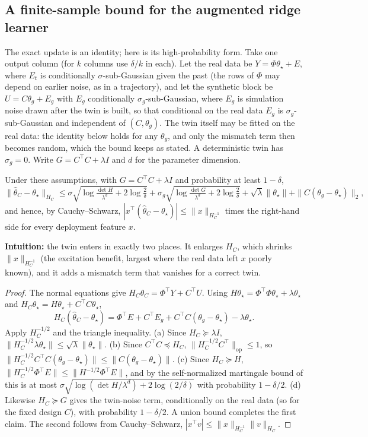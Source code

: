 \subsection{A finite-sample bound for the augmented ridge learner}\label{app:finite}
The exact update is an identity; here is its high-probability form. Take one output column (for $k$ columns use $\delta/k$ in each). Let the real data be $Y=\Phi\theta_\star+E$, where $E_t$ is conditionally $\sigma$-sub-Gaussian given the past (the rows of $\Phi$ may depend on earlier noise, as in a trajectory), and let the synthetic block be $U=C\theta_g+E_g$ with $E_g$ conditionally $\sigma_g$-sub-Gaussian, where $E_g$ is simulation noise drawn after the twin is built, so that conditional on the real data $E_g$ is $\sigma_g$-sub-Gaussian and independent of $(C,\theta_g)$. The twin itself may be fitted on the real data: the identity below holds for any $\theta_g$, and only the mismatch term then becomes random, which the bound keeps as stated. A deterministic twin has $\sigma_g=0$. Write $G=C^\top C+\lambda I$ and $d$ for the parameter dimension.

\begin{proposition}\label{prop:finite}
Under these assumptions, with $G=C^\top C+\lambda I$ and probability at least $1-\delta$,
\[
\|\widehat\theta_C-\theta_\star\|_{H_C}\le\sigma\sqrt{\log\tfrac{\det H}{\lambda^{d}}+2\log\tfrac2\delta}+\sigma_g\sqrt{\log\tfrac{\det G}{\lambda^{d}}+2\log\tfrac2\delta}+\sqrt\lambda\|\theta_\star\|+\|C(\theta_g-\theta_\star)\|_2,
\]
and hence, by Cauchy--Schwarz, $|x^\top(\widehat\theta_C-\theta_\star)|\le\|x\|_{H_C^{-1}}$ times the right-hand side for every deployment feature $x$.
\end{proposition}
\textbf{Intuition:} the twin enters in exactly two places. It enlarges $H_C$, which shrinks $\|x\|_{H_C^{-1}}$ (the excitation benefit, largest where the real data left $x$ poorly known), and it adds a mismatch term that vanishes for a correct twin.
\begin{proof}
The normal equations give $H_C\widehat\theta_C=\Phi^\top Y+C^\top U$. Using $H\theta_\star=\Phi^\top\Phi\theta_\star+\lambda\theta_\star$ and $H_C\theta_\star=H\theta_\star+C^\top C\theta_\star$,
\[
H_C(\widehat\theta_C-\theta_\star)=\Phi^\top E+C^\top E_g+C^\top C(\theta_g-\theta_\star)-\lambda\theta_\star .
\]
Apply $H_C^{-1/2}$ and the triangle inequality. (a) Since $H_C\succeq\lambda I$, $\|H_C^{-1/2}\lambda\theta_\star\|\le\sqrt\lambda\|\theta_\star\|$. (b) Since $C^\top C\preceq H_C$, $\|H_C^{-1/2}C^\top\|_{\mathrm{op}}\le1$, so $\|H_C^{-1/2}C^\top C(\theta_g-\theta_\star)\|\le\|C(\theta_g-\theta_\star)\|$. (c) Since $H_C\succeq H$, $\|H_C^{-1/2}\Phi^\top E\|\le\|H^{-1/2}\Phi^\top E\|$, and by the self-normalized martingale bound of \citet{abbasiyadkori2011improved} this is at most $\sigma\sqrt{\log(\det H/\lambda^{d})+2\log(2/\delta)}$ with probability $1-\delta/2$. (d) Likewise $H_C\succeq G$ gives the twin-noise term, conditionally on the real data (so for the fixed design $C$), with probability $1-\delta/2$. A union bound completes the first claim. The second follows from Cauchy--Schwarz, $|x^\top v|\le\|x\|_{H_C^{-1}}\|v\|_{H_C}$.
\end{proof}
